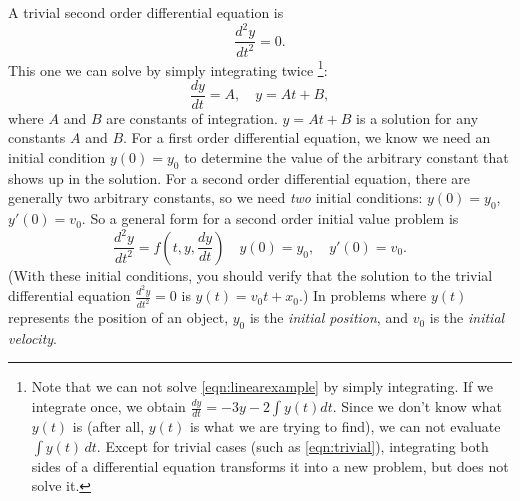 \documentclass[reqno]{immbook}
\numberwithin{equation}{chapter}
\numberwithin{question}{section}
\numberwithin{theorem}{chapter}
\numberwithin{figure}{chapter}
\theoremstyle{definition}
\begin{document}
A trivial second order differential equation is
\begin{equation}
   \frac{d^2y}{dt^2} = 0.
   \label{eqn:trivial}
\end{equation}
This one we can solve by simply integrating twice%
\footnote{Note that we can not solve \eqref{eqn:linearexample}
by simply integrating. If we integrate once, we obtain
$\frac{dy}{dt} = -3y -2\int y(t)dt$.  Since we don't know what
$y(t)$ is (after all, $y(t)$ is what we are trying to find), we can not
evaluate $\int y(t)\,dt$.  Except for trivial cases
(such as \eqref{eqn:trivial}),
integrating both sides of a differential
equation transforms it into a new problem, but does not solve it.}:
\begin{equation}
  \frac{dy}{dt} = A, \quad y = At+B,
\end{equation}
where $A$ and $B$ are constants of integration.
$y=At+B$ is a solution for any constants $A$ and $B$.
For a first order differential equation, we know we need
an initial condition $y(0)=y_0$ to determine the value of the
arbitrary constant that shows up in the solution.  For a second order
differential equation, there are generally two arbitrary constants, so
we need \emph{two} initial conditions: $y(0)=y_0$, $y'(0) = v_0$.
So a general form for a second order initial value problem is
\begin{equation}
   \frac{d^2y}{dt^2} = f\left(t,y,\frac{dy}{dt}\right)
  \quad y(0) = y_0, \quad y'(0)=v_0.
\end{equation}
(With these initial conditions, you should verify that the solution
to the trivial differential equation $\frac{d^2y}{dt^2}=0$ is $y(t)=v_0 t + x_0$.)
In problems where $y(t)$ represents the position of an object,
$y_0$ is the \emph{initial position}, and $v_0$ is the
\emph{initial velocity}.
\end{document}
